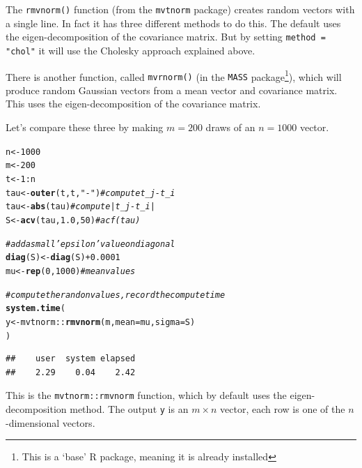 \documentclass[a4paper, 11pt, amsmath]{article}\usepackage[]{graphicx}\usepackage[]{color}
\makeatletter
\newcommand{\hlnum}[1]{\textcolor[rgb]{0.686,0.059,0.569}{#1}}%
\newcommand{\hlstr}[1]{\textcolor[rgb]{0.192,0.494,0.8}{#1}}%
\newcommand{\hlcom}[1]{\textcolor[rgb]{0.678,0.584,0.686}{\textit{#1}}}%
\newcommand{\hlopt}[1]{\textcolor[rgb]{0,0,0}{#1}}%
\newcommand{\hlstd}[1]{\textcolor[rgb]{0.345,0.345,0.345}{#1}}%
\newcommand{\hlkwb}[1]{\textcolor[rgb]{0.69,0.353,0.396}{#1}}%
\newcommand{\hlkwc}[1]{\textcolor[rgb]{0.333,0.667,0.333}{#1}}%
\newcommand{\hlkwd}[1]{\textcolor[rgb]{0.737,0.353,0.396}{\textbf{#1}}}%
\newenvironment{kframe}{%
 \def\at@end@of@kframe{}%
 \ifinner\ifhmode%
  \def\at@end@of@kframe{\end{minipage}}%
  \begin{minipage}{\columnwidth}%
 \fi\fi%
 \def\FrameCommand##1{\hskip\@totalleftmargin \hskip-\fboxsep
 \colorbox{shadecolor}{##1}\hskip-\fboxsep
     \hskip-\linewidth \hskip-\@totalleftmargin \hskip\columnwidth}%
 \MakeFramed {\advance\hsize-\width
   \@totalleftmargin\z@ \linewidth\hsize
   \@setminipage}}%
 {\par\unskip\endMakeFramed%
 \at@end@of@kframe}
\newenvironment{knitrout}{}{} %
\makeatother
\begin{document}
The {\tt rmvnorm()} function (from the {\tt mvtnorm} package) creates random vectors with a single line. In fact it has three different methods to do this. The default uses the eigen-decomposition of the covariance matrix. But by setting {\tt method = "chol"} it will use the Cholesky approach explained above. 

There is another function, called {\tt mvrnorm()} (in the {\tt MASS} package\footnote{This is a `base' R package, meaning it is already installed}), which will produce random Gaussian vectors from a mean vector and covariance matrix. This uses the eigen-decomposition of the covariance matrix. 

Let's compare these three by making $m=200$ draws of an $n=1000$ vector.

\begin{knitrout}
\color{fgcolor}\begin{kframe}
\begin{alltt}
\hlstd{n} \hlkwb{<-} \hlnum{1000}
\hlstd{m} \hlkwb{<-} \hlnum{200}
\hlstd{t} \hlkwb{<-} \hlnum{1}\hlopt{:}\hlstd{n}
\hlstd{tau} \hlkwb{<-} \hlkwd{outer}\hlstd{(t, t,} \hlstr{"-"}\hlstd{)}  \hlcom{# compute t_j - t_i}
\hlstd{tau} \hlkwb{<-} \hlkwd{abs}\hlstd{(tau)}          \hlcom{# compute |t_j - t_i|}
\hlstd{S} \hlkwb{<-} \hlkwd{acv}\hlstd{(tau,} \hlnum{1.0}\hlstd{,} \hlnum{50}\hlstd{)}   \hlcom{# acf(tau) }

\hlcom{# add a small 'epsilon' value on diagonal}
\hlkwd{diag}\hlstd{(S)} \hlkwb{<-} \hlkwd{diag}\hlstd{(S)} \hlopt{+} \hlnum{0.0001}
\hlstd{mu} \hlkwb{<-} \hlkwd{rep}\hlstd{(}\hlnum{0}\hlstd{,} \hlnum{1000}\hlstd{)}       \hlcom{# mean values}

\hlcom{# compute the randon values, record the compute time}
\hlkwd{system.time}\hlstd{(}
  \hlstd{y} \hlkwb{<-} \hlstd{mvtnorm}\hlopt{::}\hlkwd{rmvnorm}\hlstd{(m,} \hlkwc{mean} \hlstd{= mu,} \hlkwc{sigma} \hlstd{= S)}
  \hlstd{)}
\end{alltt}
\begin{verbatim}
##    user  system elapsed 
##    2.29    0.04    2.42
\end{verbatim}
\end{kframe}
\end{knitrout}

This is the {\tt mvtnorm::rmvnorm} function, which by default uses the eigen-decomposition method. The output {\tt y} is an $m \times n$ vector, each row is one of the $n$-dimensional vectors.
\end{document}
